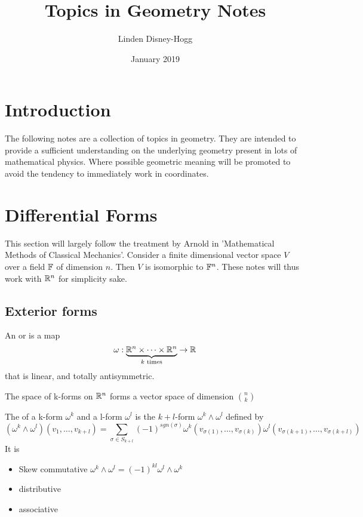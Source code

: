 \documentclass{article}
\title{Topics in Geometry Notes}
\author{Linden Disney-Hogg}
\date{January 2019}
\begin{document}
\maketitle
\tableofcontents

\section{Introduction}
The following notes are a collection of topics in geometry. They are intended to provide a sufficient understanding on the underlying geometry present in lots of mathematical physics. Where possible geometric meaning will be promoted to avoid the tendency to immediately work in coordinates.

\section{Differential Forms}
This section will largely follow the treatment by Arnold in 'Mathematical Methods of Classical Mechanics'. Consider a finite dimensional vector space $V$ over a field $\mathbb{F}$ of dimension $n$. Then $V$ is isomorphic to $\mathbb{F}^n$. These notes will thus work with $\mathbb{R}^n$ for simplicity sake. 

\subsection{Exterior forms}

\begin{definition}[k-form]
An  or  is a map 
\[
\omega : \underbrace{\mathbb{R}^n \times \dots \times \mathbb{R}^n}_{k\text{ times}} \to \mathbb{R}
\]
that is linear, and totally antisymmetric.
\end{definition}

\begin{theorem}
The space of k-forms on $\mathbb{R}^n$ forms a vector space of dimension $\binom{n}{k}$
\end{theorem}

\begin{definition}
The  of a k-form $\omega^k$ and a l-form $\omega^l$ is the $k+l$-form $\omega^k \wedge \omega^l$ defined by 
\[
(\omega^k\wedge\omega^l)(v_1,\dots,v_{k+l}) = \sum_{\sigma \in S_{k+l}} (-1)^{sgn(\sigma)} \omega^k(v_{\sigma(1)},\dots,v_{\sigma(k)}) \omega^l(v_{\sigma(k+1)},\dots,v_{\sigma(k+l)})
\]
It is 
\begin{itemize}
    \item Skew commutative $\omega^k \wedge \omega^l = (-1)^{kl} \omega^l \wedge \omega^k$
    \item distributive
    \item associative 
\end{itemize}
\end{definition}
\end{document}
